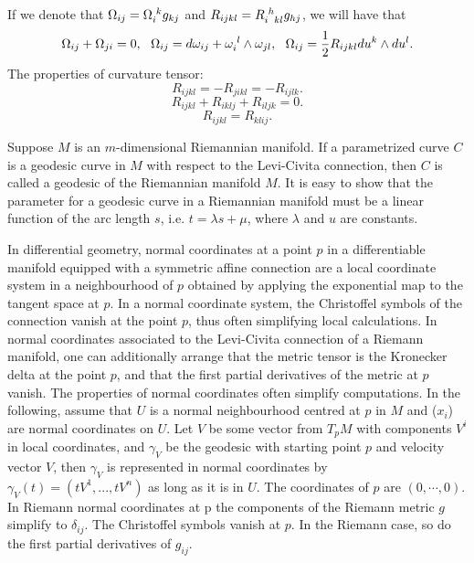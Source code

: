 \begin{newprop}
If we denote that $\Omega_{ij} = \tensor{\Omega}{_i^k}g_{kj}$ and $R_{ijkl} = \tensor{R}{_i^h_{kl}} g_{hj}$, we will have that
\[\Omega_{ij} + \Omega_{ji} = 0,\ \ \Omega_{ij} = d\omega_{ij} + \tensor{\omega}{_i^l} \wedge \omega_{jl},\ \ \Omega_{ij} = \frac{1}{2}R_{ijkl}du^k \wedge du^l.\]
The properties of curvature tensor:
\[R_{ijkl} = -R_{jikl} = -R_{ijlk}.\]
\[R_{ijkl}+R_{iklj}+R_{iljk}=0.\]
\[R_{ijkl} = R_{klij}.\]
\end{newprop}

\begin{newdef}[Geodesic]
Suppose $M$ is an $m$-dimensional Riemannian manifold. 
If a parametrized curve $C$ is a geodesic curve in $M$ with respect to the Levi-Civita connection, then $C$ is called a geodesic of the Riemannian manifold $M$.
It is easy to show that the parameter for a geodesic curve in a Riemannian manifold must be a linear function of the arc length $s$, i.e. $t = \lambda s + \mu$, where $\lambda$ and $u$ are constants.
\end{newdef}

\begin{newdef}
In differential geometry, normal coordinates at a point $p$ in a differentiable manifold equipped with a symmetric affine connection are a local coordinate system in a neighbourhood of $p$ obtained by applying the exponential map to the tangent space at $p$. In a normal coordinate system, the Christoffel symbols of the connection vanish at the point $p$, thus often simplifying local calculations. In normal coordinates associated to the Levi-Civita connection of a Riemann manifold, one can additionally arrange that the metric tensor is the Kronecker delta at the point $p$, and that the first partial derivatives of the metric at $p$ vanish.
The properties of normal coordinates often simplify computations. In the following, assume that $U$ is a normal neighbourhood centred at $p$ in $M$ and ($x_i$) are normal coordinates on $U$.
Let $V$ be some vector from $T_pM$ with components $V^i$ in local coordinates, and $\gamma_V$ be the geodesic with starting point $p$ and velocity vector $V$, then $\gamma_V$ is represented in normal coordinates by $\gamma _{V}(t)=(tV^{1},...,tV^{n})$ as long as it is in $U$.
The coordinates of $p$ are $(0, \cdots, 0)$.
In Riemann normal coordinates at p the components of the Riemann metric $g$ simplify to $\delta _{ij}$.
The Christoffel symbols vanish at $p$. In the Riemann case, so do the first partial derivatives of $g_{ij}$.
\end{newdef}

